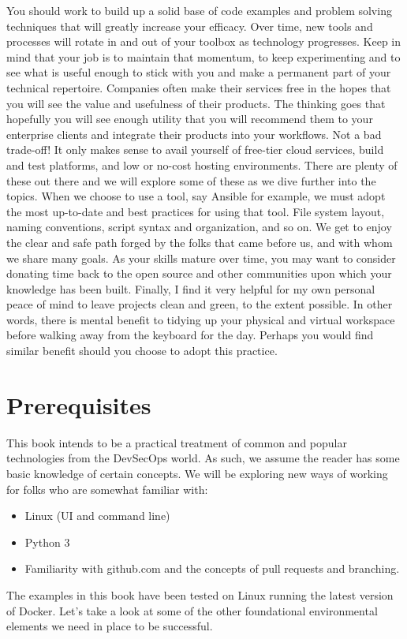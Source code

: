 \justify{}
You should work to build up a solid base of code examples and problem solving
techniques that will greatly increase your efficacy. Over time, new tools and
processes will rotate in and out of your toolbox as technology progresses. Keep
in mind that your job is to maintain that momentum, to keep experimenting and
to see what is useful enough to stick with you and make a permanent part of your
technical repertoire.
\justify{}
Companies often make their services free in the hopes that you will see the
value and usefulness of their products. The thinking goes that hopefully
you will see enough utility that you will recommend them to your
enterprise clients and integrate their products into your workflows.
Not a bad trade-off! It only makes sense to avail yourself of free-tier
cloud services, build and test platforms, and low or no-cost hosting
environments. There are plenty of these out there and we will explore
some of these as we dive further into the topics.
\justify{}
When we choose to use a tool, say Ansible for example, we must adopt the
most up-to-date and best practices for using that tool.
File system layout, naming conventions, script syntax and organization,
and so on. We get to enjoy the clear and safe path forged by the folks
that came before us, and with whom we share many goals. As your skills
mature over time, you may want to consider donating time back to the
open source and other communities upon which your knowledge has been
built.
\justify{}
Finally, I find it very helpful for my own personal peace of mind to
leave projects clean and green, to the extent possible. In other words,
there is mental benefit to tidying up your physical and virtual workspace
before walking away from the keyboard for the day. Perhaps you would
find similar benefit should you choose to adopt this practice.
\section{Prerequisites}
\justify{}
This book intends to be a practical treatment of common and popular technologies
from the DevSecOps world. As such, we assume the reader has some basic knowledge
of certain concepts. We will be exploring new ways of working for folks who
are somewhat familiar with:
\begin{itemize}
	\item
	    Linux (UI and command line)
	\item 
            Python 3
	\item
	    Familiarity with github.com and the concepts of pull requests and branching.
\end{itemize}
\justify{}
The examples in this book have been tested on Linux running the latest
version of Docker.
\justify{}
Let's take a look at some of the other foundational environmental
elements we need in place to be successful.
